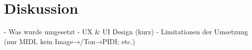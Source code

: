 \chapter{Diskussion} \label{diskussion}

\nocite{*}
- Was wurde umgesetzt \newline
- UX & UI Design (kurz) \newline
- Limitationen der Umsetzung (nur MIDI, kein Image→/Ton→PIDI; etc.)